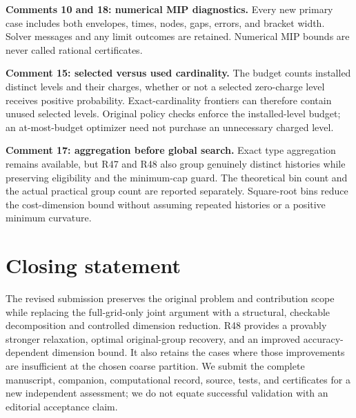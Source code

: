 \documentclass[11pt,letterpaper]{article}
\begin{document}
\textbf{Comments 10 and 18: numerical MIP diagnostics.} Every new primary case includes both envelopes, times, nodes, gaps, errors, and bracket width. Solver messages and any limit outcomes are retained. Numerical MIP bounds are never called rational certificates.



\textbf{Comment 15: selected versus used cardinality.} The budget counts installed distinct levels and their charges, whether or not a selected zero-charge level receives positive probability. Exact-cardinality frontiers can therefore contain unused selected levels. Original policy checks enforce the installed-level budget; an at-most-budget optimizer need not purchase an unnecessary charged level.



\textbf{Comment 17: aggregation before global search.} Exact type aggregation remains available, but R47 and R48 also group genuinely distinct histories while preserving eligibility and the minimum-cap guard. The theoretical bin count and the actual practical group count are reported separately. Square-root bins reduce the cost-dimension bound without assuming repeated histories or a positive minimum curvature.



\section*{Closing statement}


The revised submission preserves the original problem and contribution scope while replacing the full-grid-only joint argument with a structural, checkable decomposition and controlled dimension reduction. R48 provides a provably stronger relaxation, optimal original-group recovery, and an improved accuracy-dependent dimension bound. It also retains the cases where those improvements are insufficient at the chosen coarse partition. We submit the complete manuscript, companion, computational record, source, tests, and certificates for a new independent assessment; we do not equate successful validation with an editorial acceptance claim.
\end{document}
